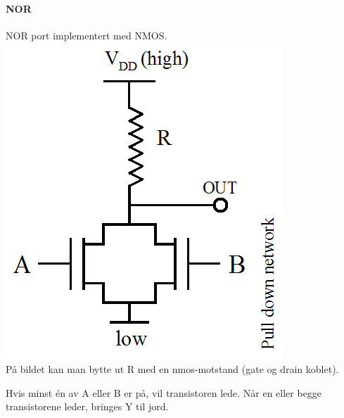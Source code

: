 \paragraph{NOR} \mbox \\
NOR port implementert med NMOS.
\\
\includegraphics{./img/nmos-nor}
\\
På bildet kan man bytte ut R med en nmos-motstand (gate og drain koblet).

Hvis minst én av A eller B er på, vil transistoren lede.
Når en eller begge transistorene leder, bringes Y til jord.
